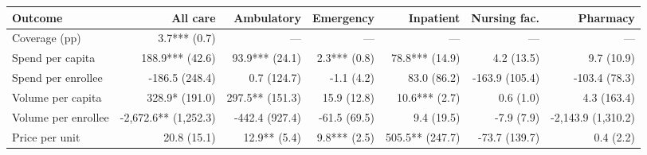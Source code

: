 \begin{tabular}{@{}l rrrrrr@{}}
\toprule
Outcome & All care & Ambulatory & Emergency & Inpatient & Nursing fac. & Pharmacy \\
\midrule
Coverage (pp) & 3.7*** (0.7) & --- & --- & --- & --- & --- \\
Spend per capita & 188.9*** (42.6) & 93.9*** (24.1) & 2.3*** (0.8) & 78.8*** (14.9) & 4.2 (13.5) & 9.7 (10.9) \\
Spend per enrollee & -186.5 (248.4) & 0.7 (124.7) & -1.1 (4.2) & 83.0 (86.2) & -163.9 (105.4) & -103.4 (78.3) \\
Volume per capita & 328.9* (191.0) & 297.5** (151.3) & 15.9 (12.8) & 10.6*** (2.7) & 0.6 (1.0) & 4.3 (163.4) \\
Volume per enrollee & -2,672.6** (1,252.3) & -442.4 (927.4) & -61.5 (69.5) & 9.4 (19.5) & -7.9 (7.9) & -2,143.9 (1,310.2) \\
Price per unit & 20.8 (15.1) & 12.9** (5.4) & 9.8*** (2.5) & 505.5** (247.7) & -73.7 (139.7) & 0.4 (2.2) \\
\bottomrule
\end{tabular}
